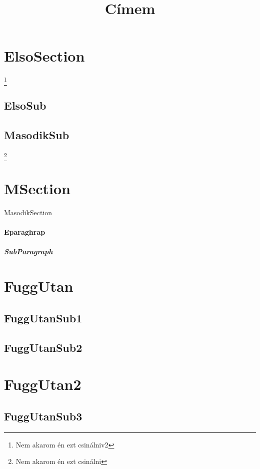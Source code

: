 \documentclass[twocolumn,columnsep=1cm]{article}
\begin{document}
\title{Címem}
\maketitle 

\begin{abstract}
\hulipsum[1-2]
\end{abstract}

\tableofcontents
{}
\pagebreak

\section{ElsoSection} \footnote{Nem akarom én ezt csinálniv2}
\subsection{ElsoSub}
\hulipsum[1-2]

\subsection{MasodikSub}
\hulipsum[1-2]

\footnote{Nem akarom én ezt csinálni}

\pagebreak

\section{MSection}{MasodikSection}
\paragraph {Eparaghrap}
\subparagraph{SubParagraph}

\appendix

\section{FuggUtan}
\subsection{FuggUtanSub1}

\quote
\hulipsum[1]


\subsection{FuggUtanSub2}

\section{FuggUtan2}
\quotation
\hulipsum[1]

\subsection{FuggUtanSub3}
\verse 
\hulipsum[1]
\end{document}
